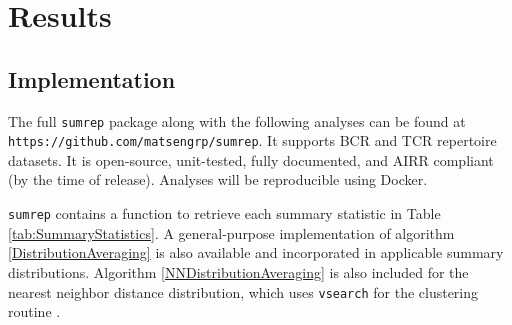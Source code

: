 \documentclass{article}
\begin{document}
\section*{Results}

\subsection*{Implementation}
The full \texttt{sumrep} package along with the following analyses can be found at \texttt{https://github.com/matsengrp/sumrep}.
It supports BCR and TCR repertoire datasets.
It is open-source, unit-tested, fully documented, and AIRR compliant (by the time of release).
Analyses will be reproducible using Docker.

\texttt{sumrep} contains a function to retrieve each summary statistic in Table \ref{tab:SummaryStatistics}.
A general-purpose implementation of algorithm \ref{DistributionAveraging} is also available and incorporated in applicable summary distributions.
Algorithm \ref{NNDistributionAveraging} is also included for the nearest neighbor distance distribution, which uses \texttt{vsearch} for the clustering routine \cite{Rognes2016-bl}.
\end{document}
